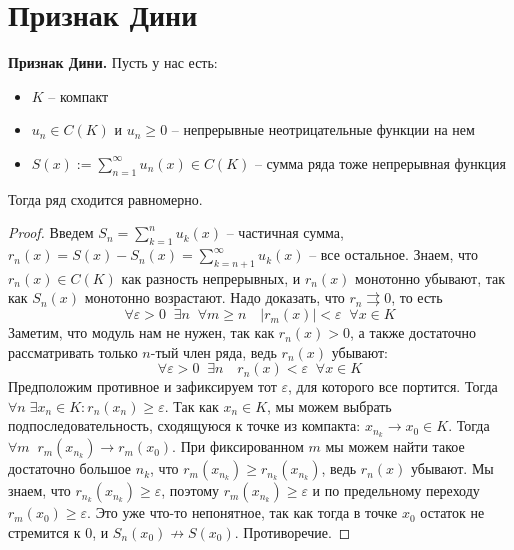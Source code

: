 \section{Признак Дини}
\textbf{Признак Дини.} 
Пусть у нас есть:
\begin{itemize}
    \item $K$ -- компакт
    \item $u_n \in C(K)$ и $u_n \geqslant 0$ -- непрерывные неотрицательные функции на нем
    \item $S(x) := \sum\limits_{n = 1}^\infty u_n(x) \in C(K)$ -- сумма ряда тоже непрерывная функция
\end{itemize}
Тогда ряд сходится равномерно.
\begin{proof}
    Введем $S_n = \sum\limits_{k = 1}^n u_k(x)$ -- частичная сумма, $r_n(x) = S(x) - S_n(x) = \sum\limits_{k = n+1}^\infty u_k(x)$ -- все остальное.
    Знаем, что $r_n(x) \in C(K)$ как разность непрерывных, и $r_n(x)$ монотонно убывают, так как $S_n(x)$ монотонно возрастают.
    Надо доказать, что $r_n \rightrightarrows 0$, то есть \[ \forall \varepsilon > 0  \;\; \exists n \;\; \forall m \geqslant n \quad |r_m(x)| < \varepsilon \;\; \forall x \in K \]
    Заметим, что модуль нам не нужен, так как $r_n(x) > 0$, а также достаточно рассматривать только $n$-тый член ряда, ведь $r_n(x)$ убывают:
    \[ \forall \varepsilon > 0  \;\; \exists n \quad r_n(x) < \varepsilon \;\; \forall x \in K \]
    Предположим противное и зафиксируем тот $\varepsilon$, для которого все портится.
    Тогда $\forall n \; \exists x_n \in K : r_n(x_n) \geqslant \varepsilon$. 
    Так как $x_n \in K$, мы можем выбрать подпоследовательность, сходящуюся к точке из компакта: $x_{n_k} \to x_0 \in K$.
    Тогда $\forall m \;\; r_m(x_{n_k}) \to r_m(x_0)$. 
    При фиксированном $m$ мы можем найти такое достаточно большое $n_k$, что $r_m(x_{n_k}) \geqslant r_{n_k}(x_{n_k})$, ведь $r_n(x)$ убывают.
    Мы знаем, что $r_{n_k}(x_{n_k}) \geqslant \varepsilon$, поэтому $r_m(x_{n_k}) \geqslant \varepsilon$ и по предельному переходу $r_m(x_0) \geqslant \varepsilon$.
    Это уже что-то непонятное, так как тогда в точке $x_0$ остаток не стремится к 0, и $S_n(x_0) \nrightarrow S(x_0)$. Противоречие. 
\end{proof}
